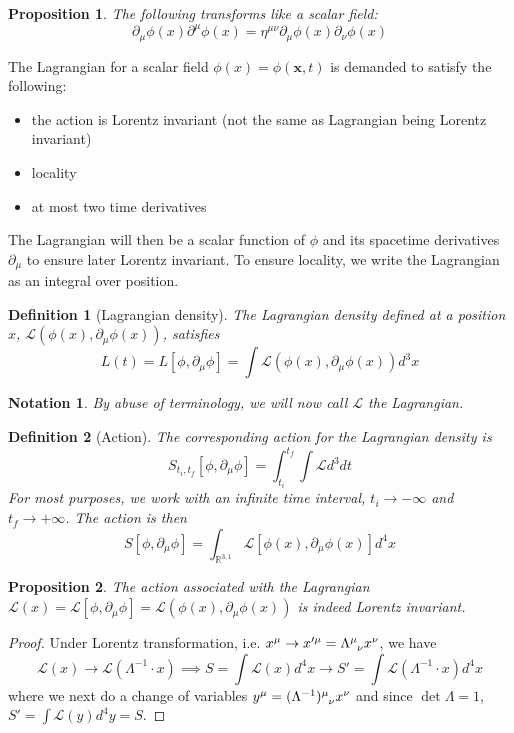 \documentclass[a4paper]{article}
\newtheorem{notation}{Notation}[section]
\theoremstyle{new}
\newtheorem{defi}{Definition}[section]
\newtheorem{prop}{Proposition}[section]
\begin{document}
\begin{prop}
The following transforms like a scalar field:
$$\partial_\mu\phi(x)\partial^\mu\phi(x)=\eta^{\mu\nu}\partial_\mu\phi(x)\partial_\nu\phi(x)$$
\end{prop}
The Lagrangian for a scalar field $\phi(x)=\phi(\mathbf{x},t)$ is demanded to satisfy the following:
\begin{itemize}
    \item the action is Lorentz invariant (not the same as Lagrangian being Lorentz invariant)
    \item locality
    \item at most two time derivatives
\end{itemize}
The Lagrangian will then be a scalar function of $\phi$ and its spacetime derivatives $\partial_\mu$ to ensure later Lorentz invariant. To ensure locality, we write the Lagrangian as an integral over position.
\begin{defi}[Lagrangian density]
The Lagrangian density defined at a position $x$, $\mathcal{L}(\phi(x),\partial_\mu\phi(x))$, satisfies
$$L(t)=L[\phi,\partial_\mu\phi]=\int\mathcal{L}(\phi(x),\partial_\mu\phi(x))d^3x$$
\end{defi}
\begin{notation}
By abuse of terminology, we will now call $\mathcal{L}$ the Lagrangian.
\end{notation}
\begin{defi}[Action]
The corresponding action for the Lagrangian density is
$$S_{t_i,t_f}[\phi,\partial_\mu\phi]=\int_{t_i}^{t_f}\int\mathcal{L}d^3dt$$
For most purposes, we work with an infinite time interval, $t_i\rightarrow-\infty$ and $t_f\rightarrow+\infty$. The action is then
$$S[\phi,\partial_\mu\phi]=\int_{\mathbb{R}^{3,1}}\mathcal{L}[\phi(x),\partial_\mu\phi(x)]d^4x$$
\end{defi}
\begin{prop}
The action associated with the Lagrangian $\mathcal{L}(x)=\mathcal{L}[\phi,\partial_\mu\phi]=\mathcal{L}(\phi(x),\partial_\mu\phi(x))$ is indeed Lorentz invariant.
\end{prop}
\begin{proof}
Under Lorentz transformation, i.e. $x^\mu\rightarrow x'^\mu=\tensor*{\Lambda}{*_{}^{\mu}_{\nu}}x^\nu$, we have
$$\mathcal{L}(x)\rightarrow\mathcal{L}(\Lambda^{-1}\cdot x)\implies S=\int\mathcal{L}(x)d^4x\rightarrow S'=\int\mathcal{L}(\Lambda^{-1}\cdot x)d^4x$$
where we next do a change of variables $y^\mu=\tensor*{(\Lambda^{-1})}{*_{}^{\mu}_{\nu}}x^\nu$ and since $\det\Lambda=1$, $S'=\int\mathcal{L}(y)d^4y=S$.
\end{proof}
\end{document}
